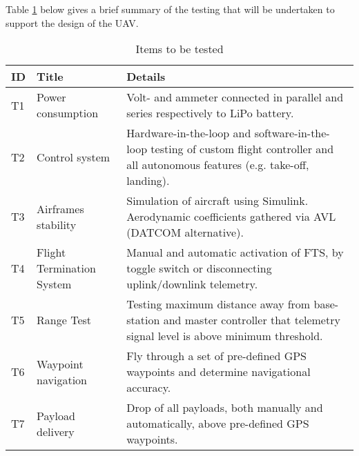 Table \ref{tab:tests} below gives a brief summary of the testing that will be undertaken to support the design of the UAV.

\begin{table}[h]
\centering
\begin{tabularx}{\textwidth}{ p{} | X | p{} } 
\textbf{ID} & \textbf{Title} & \textbf{Details} \\ \hline
T1 & Power consumption & Volt- and ammeter connected in parallel and series respectively to LiPo battery. \\ \hline
T2 & Control system & Hardware-in-the-loop and software-in-the-loop testing of custom flight controller and all autonomous features (e.g. take-off, landing). \\ \hline
T3 & Airframes stability & Simulation of aircraft using Simulink. Aerodynamic coefficients gathered via AVL (DATCOM alternative). \\ \hline
T4 & Flight Termination System & Manual and automatic activation of FTS, by toggle switch or disconnecting uplink/downlink telemetry. \\ \hline
T5 & Range Test & Testing maximum distance away from base-station and master controller that telemetry signal level is above minimum threshold. \\ \hline
T6 & Waypoint navigation & Fly through a set of pre-defined GPS waypoints and determine navigational accuracy. \\ \hline
T7 & Payload delivery & Drop of all payloads, both manually and automatically, above pre-defined GPS waypoints. \\
\end{tabularx}
\caption{Items to be tested}
\label{tab:tests}
\end{table}
